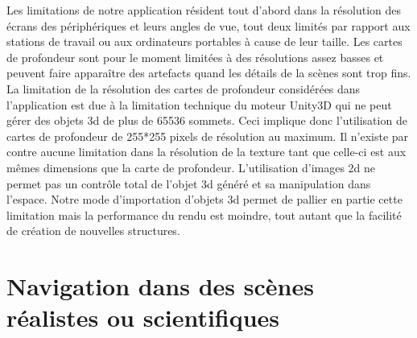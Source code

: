 Les limitations de notre application résident tout d'abord dans la résolution des écrans des périphériques et leurs angles de vue, tout deux limités par rapport aux stations de travail ou aux ordinateurs portables à cause de leur taille. Les cartes de profondeur sont pour le moment limitées à des résolutions assez basses et peuvent faire apparaître des artefacts quand les détails de la scènes sont trop fins. La limitation de la résolution des cartes de profondeur considérées dans l'application est due à la limitation technique du moteur Unity3D qui ne peut gérer des objets 3d de plus de 65536 sommets. Ceci implique donc l'utilisation de cartes de profondeur de 255*255 pixels de résolution au maximum. Il n'existe par contre aucune limitation dans la résolution de la texture tant que celle-ci est aux mêmes dimensions que la carte de profondeur. L'utilisation d'images 2d ne permet pas un contrôle total de l'objet 3d généré et sa manipulation dans l'espace. Notre mode d'importation d'objets 3d permet de pallier en partie cette limitation mais la performance du rendu est moindre, tout autant que la facilité de création de nouvelles structures.


\section{Navigation dans des scènes réalistes ou scientifiques}


